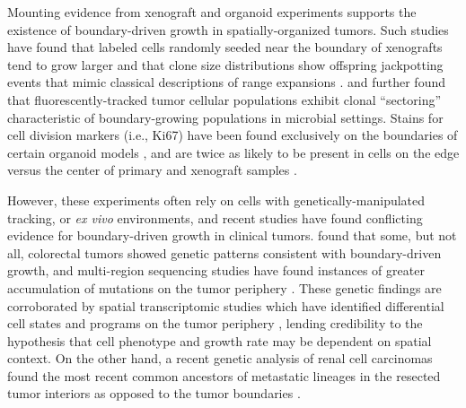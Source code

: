 \documentclass[12pt]{elife_based}
\begin{document}
Mounting evidence from xenograft and organoid experiments supports the existence of boundary-driven growth in spatially-organized tumors. Such studies have found that labeled cells randomly seeded near the boundary of xenografts tend to grow larger \citep{lamprecht2017multicolor, lenos2018stem, van2019spatiotemporal} and that clone size distributions show offspring jackpotting events that mimic classical descriptions of range expansions \citep{lenos2018stem}. \cite{reeves2018multicolour} and \cite{lamprecht2017multicolor} further found that fluorescently-tracked tumor cellular populations exhibit clonal ``sectoring'' characteristic of boundary-growing populations in microbial settings. Stains for cell division markers (i.e., Ki67) have been found exclusively on the boundaries of certain organoid models \citep{florian2019human}, and are twice as likely to be present in cells on the edge versus the center of primary and xenograft samples \citep{lamprecht2017multicolor}. 

However, these experiments often rely on cells with genetically-manipulated tracking, or \textit{ex vivo} environments, and recent studies have found conflicting evidence for  boundary-driven growth in clinical tumors. \cite{Heide2021.07.14.451265} found that some, but not all, colorectal tumors showed genetic patterns consistent with boundary-driven growth, and multi-region sequencing studies have found instances of greater accumulation of mutations on the tumor periphery \citep{ling2015extremely, Li2022}. These genetic findings are corroborated by spatial transcriptomic studies which have identified differential cell states and programs on the tumor periphery \citep{berglund2018, Wu2021.10.21.465135, wu2021single}, lending credibility to the hypothesis that cell phenotype and growth rate may be dependent on spatial context.  On the other hand, a recent genetic analysis of renal cell carcinomas found the most recent common ancestors of metastatic lineages in the resected tumor interiors as opposed to the tumor boundaries \citep{zhao2021selection}.
\end{document}
